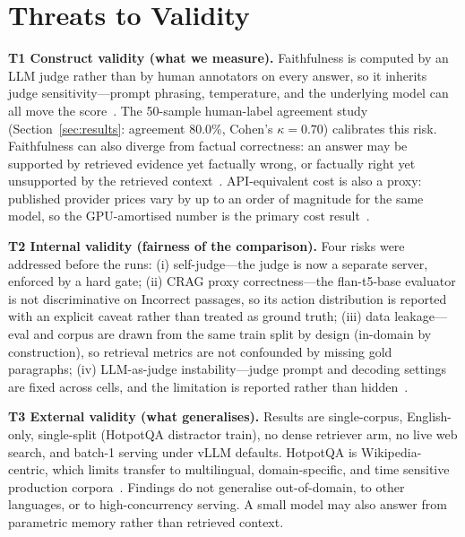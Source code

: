 
\section{Threats to Validity}
\label{sec:threats}

\textbf{T1 Construct validity (what we measure).}
Faithfulness is computed by an LLM judge rather than by human annotators
on every answer, so it inherits judge sensitivity---prompt phrasing,
temperature, and the underlying model can all move the
score~\cite{es2023ragas,murugaraj2025ragvue}. The 50-sample human-label
agreement study (Section~\ref{sec:results}: agreement 80.0\%, Cohen's
$\kappa = 0.70$) calibrates this risk.
Faithfulness can also diverge from factual correctness: an answer may be
supported by retrieved evidence yet factually wrong, or factually right
yet unsupported by the retrieved context~\cite{murugaraj2025ragvue}.
API-equivalent cost is also a proxy: published provider prices vary by up
to an order of magnitude for the same model, so the GPU-amortised number
is the primary cost result~\cite{elkiran2026empirical}.

\textbf{T2 Internal validity (fairness of the comparison).}
Four risks were addressed before the runs: (i) self-judge---the judge is
now a separate server, enforced by a hard gate; (ii) CRAG proxy
correctness---the flan-t5-base evaluator is not discriminative on
Incorrect passages, so its action distribution is reported with an
explicit caveat rather than treated as ground truth; (iii) data
leakage---eval and corpus are drawn from the same train split by design
(in-domain by construction), so retrieval metrics are not confounded by
missing gold paragraphs; (iv) LLM-as-judge instability---judge prompt and
decoding settings are fixed across cells, and the limitation is reported
rather than hidden~\cite{murugaraj2025ragvue}.

\textbf{T3 External validity (what generalises).}
Results are single-corpus, English-only, single-split (HotpotQA
distractor train), no dense retriever arm, no live web search, and
batch-1 serving under vLLM defaults. HotpotQA is Wikipedia-centric,
which limits transfer to multilingual, domain-specific, and time
sensitive production corpora~\cite{wu2024survey,elkiran2026empirical,zeng2025rare,li2025biomedical}.
Findings do not generalise out-of-domain, to other languages, or to
high-concurrency serving. A small model may also answer from parametric
memory rather than retrieved context.

